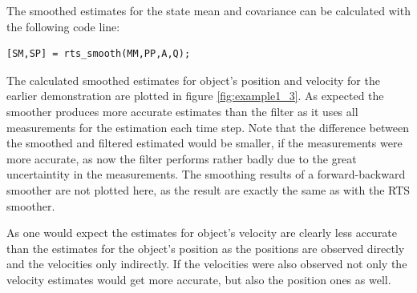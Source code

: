 
The smoothed estimates for the state mean and covariance can be calculated with the
following code line:
%
\begin{lstlisting}
[SM,SP] = rts_smooth(MM,PP,A,Q);
\end{lstlisting}
%
The calculated smoothed estimates for object's position and velocity for the
earlier demonstration are plotted in figure \ref{fig:example1_3}. As expected
the smoother produces more accurate estimates than the filter as it uses all
measurements for the estimation each time step. Note that the difference between
the smoothed and filtered estimated would be smaller, if the measurements were
more accurate, as now the filter performs rather badly due to the great
uncertaintity in the measurements. The smoothing results of a
forward-backward smoother are not plotted here, as the result are
exactly the same as with the RTS smoother. 

As one would expect the estimates for object's velocity are clearly less
accurate than the estimates for the object's position as the positions are
observed directly and the velocities only indirectly. If the
velocities were also observed not only the velocity estimates would get
more accurate, but also the position ones as well. 





